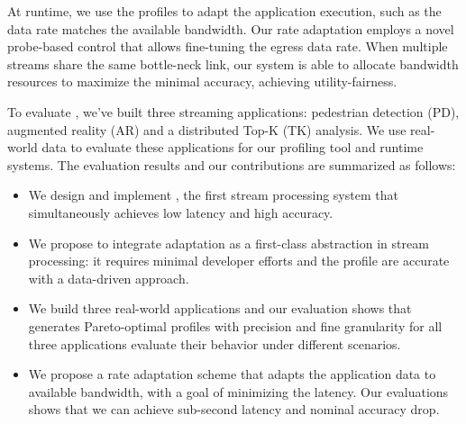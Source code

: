 At runtime, we use the profiles to adapt the application execution, such as the
data rate matches the available bandwidth. Our rate adaptation employs a novel
probe-based control that allows fine-tuning the egress data rate. When multiple
streams share the same bottle-neck link, our system is able to allocate
bandwidth resources to maximize the minimal accuracy, achieving
utility-fairness.

To evaluate \sysname{}, we've built three streaming applications: pedestrian
detection (PD), augmented reality (AR) and a distributed Top-K (TK) analysis. We
use real-world data to evaluate these applications for our profiling tool and
runtime systems. The evaluation results and our contributions are summarized as
follows:

\begin{itemize}[leftmargin=16pt]
\item We design and implement \sysname{}, the first stream processing system
  that simultaneously achieves low latency and high accuracy.
\item We propose to integrate adaptation as a first-class abstraction in stream
  processing: it requires minimal developer efforts and the profile are accurate
  with a data-driven approach.
\item We build three real-world applications and our evaluation shows that
  \sysname{} generates Pareto-optimal profiles with precision and fine
  granularity for all three applications evaluate their behavior under different
  scenarios.
\item We propose a rate adaptation scheme that adapts the application data to
  available bandwidth, with a goal of minimizing the latency. Our evaluations
  shows that we can achieve sub-second latency and nominal accuracy drop.
\end{itemize}


